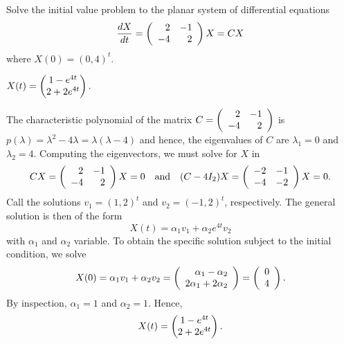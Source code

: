 \documentclass{ximera}
\author{Matthew Carr}
\begin{document}

\begin{exercise}\label{mc.exercise8}

Solve the initial value problem to the planar system of differential equations
\[
\frac{dX}{dt} = \left(\begin{array}{rrrrrrrrrrrrrrrrrr} 2 & -1 \\ -4 & 2 \end{array}\right) X = CX 
\]
where $X(0) = (0,4)^t$. 
  
\begin{solution}

\ans $X(t) = \begin{pmatrix} 1 - e^{4t}\\ 2+2e^{4t} \end{pmatrix}\ldotp$

\soln The characteristic polynomial of the matrix $C=\left(\begin{array}{rrrrrrrrrrrrrrrrrr} 2 & -1 \\ -4 & 2 \end{array}\right)$ is $p(\lambda)=\lambda^2 -4\lambda = \lambda(\lambda-4)$ and hence, the eigenvalues of $C$ are $\lambda_1 = 0$ and $\lambda_2 = 4$. Computing the eigenvectors, we must solve for $X$ in 
\[
CX =  \left(\begin{array}{rrrrrrrrrrrrrrrrrr} 2 & -1 \\ -4 & 2 \end{array}\right) X  = 0 \quad\mbox{and}\quad (C - 4I_2)  X =  \left(\begin{array}{rrrrrrrrrrrrrrrrrr} -2 & -1 \\ -4 & -2 \end{array}\right) X  = 0\ldotp
\]
Call the solutions $v_1 = (1,2)^t$ and $v_2 = (-1, 2)^t$, respectively. The general solution is then of the form
\[
X(t) = \alpha_1 v_1 + \alpha_2 e^{4t} v_2
\]
with $\alpha_1$ and $\alpha_2$ variable. To obtain the specific solution subject to the initial condition, we solve 
\[
X(0) =  \alpha_1 v_1 + \alpha_2 v_2 = \left(\begin{array}{rrrrrrrrrrrrrrrrrr} \alpha_1 -\alpha_2 \\ 2\alpha_1 + 2\alpha_2 \end{array}\right) = \left(\begin{array}{rrrrrrrrrrrrrrrrrr} 0\\4 \end{array}\right)\ldotp
\]
By inspection, $\alpha_1 = 1$ and $\alpha_2 = 1$. Hence, 
\[
X(t) = \begin{pmatrix} 1 - e^{4t}\\ 2+2e^{4t} \end{pmatrix}\ldotp
\]
\end{solution}
\end{exercise}
\end{document}
